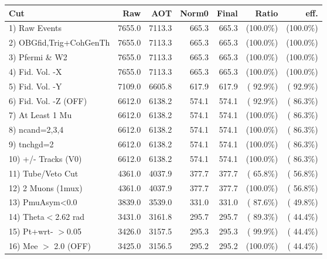  \begin{table}[h!]\centering
 \begin{tabular}{||l||r|r|r|r|r|r||}
 \hline
 \hline
 Cut & Raw & AOT & Norm0 & Final & Ratio & eff.       \\
 \hline
  1) Raw Events           &       7655.0 &       7113.3 &        665.3 &        665.3 & (100.0\%) & (100.0\%) \\
  2) OBGfid,Trig+CohGenTh &       7655.0 &       7113.3 &        665.3 &        665.3 & (100.0\%) & (100.0\%) \\
  3) Pfermi \& W2         &       7655.0 &       7113.3 &        665.3 &        665.3 & (100.0\%) & (100.0\%) \\
  4) Fid. Vol. -X         &       7655.0 &       7113.3 &        665.3 &        665.3 & (100.0\%) & (100.0\%) \\
  5) Fid. Vol. -Y         &       7109.0 &       6605.8 &        617.9 &        617.9 & ( 92.9\%) & ( 92.9\%) \\
  6) Fid. Vol. -Z (OFF)   &       6612.0 &       6138.2 &        574.1 &        574.1 & ( 92.9\%) & ( 86.3\%) \\
  7) At Least 1 Mu        &       6612.0 &       6138.2 &        574.1 &        574.1 & (100.0\%) & ( 86.3\%) \\
  8) ncand=2,3,4          &       6612.0 &       6138.2 &        574.1 &        574.1 & (100.0\%) & ( 86.3\%) \\
  9) tnchgd=2             &       6612.0 &       6138.2 &        574.1 &        574.1 & (100.0\%) & ( 86.3\%) \\
 10) +/- Tracks (V0)      &       6612.0 &       6138.2 &        574.1 &        574.1 & (100.0\%) & ( 86.3\%) \\
 11) Tube/Veto Cut        &       4361.0 &       4037.9 &        377.7 &        377.7 & ( 65.8\%) & ( 56.8\%) \\
 12) 2 Muons (1mux)       &       4361.0 &       4037.9 &        377.7 &        377.7 & (100.0\%) & ( 56.8\%) \\
 13) PmuAsym<0.0          &       3839.0 &       3539.0 &        331.0 &        331.0 & ( 87.6\%) & ( 49.8\%) \\
 14) Theta$<$2.62 rad     &       3431.0 &       3161.8 &        295.7 &        295.7 & ( 89.3\%) & ( 44.4\%) \\
 15) Pt+wrt- $>$0.05      &       3426.0 &       3157.5 &        295.3 &        295.3 & ( 99.9\%) & ( 44.4\%) \\
 16) Mee $>$ 2.0  (OFF)   &       3425.0 &       3156.5 &        295.2 &        295.2 & (100.0\%) & ( 44.4\%) \\

\end{tabular}
\end{table}
